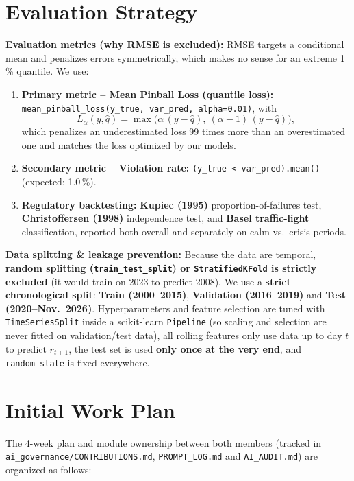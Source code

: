 \documentclass[10pt,a4paper]{article}
\newcommand{\code}[1]{\texttt{\small #1}}
\begin{document}
\section{Evaluation Strategy}
\textbf{Evaluation metrics (why RMSE is excluded):} RMSE targets a conditional mean and penalizes errors symmetrically, which makes no sense for an extreme 1\,\% quantile. We use:
\begin{enumerate}
  \item \textbf{Primary metric -- Mean Pinball Loss (quantile loss):} \code{mean\_pinball\_loss(y\_true, var\_pred, alpha=0.01)}, with
  \[
    L_\alpha(y,\hat q) = \max\big(\alpha\,(y-\hat q),\ (\alpha-1)\,(y-\hat q)\big),
  \]
  which penalizes an underestimated loss 99 times more than an overestimated one and matches the loss optimized by our models.
  \item \textbf{Secondary metric -- Violation rate:} \code{(y\_true < var\_pred).mean()} (expected: 1.0\,\%).
  \item \textbf{Regulatory backtesting:} \textbf{Kupiec (1995)} proportion-of-failures test, \textbf{Christoffersen (1998)} independence test, and \textbf{Basel traffic-light} classification, reported both overall and separately on calm vs.\ crisis periods.
\end{enumerate}

\textbf{Data splitting \& leakage prevention:} Because the data are temporal, \textbf{random splitting (\code{train\_test\_split}) or \code{StratifiedKFold} is strictly excluded} (it would train on 2023 to predict 2008). We use a \textbf{strict chronological split}: \textbf{Train (2000--2015)}, \textbf{Validation (2016--2019)} and \textbf{Test (2020--Nov.\ 2026)}. Hyperparameters and feature selection are tuned with \code{TimeSeriesSplit} inside a scikit-learn \code{Pipeline} (so scaling and selection are never fitted on validation/test data), all rolling features only use data up to day $t$ to predict $r_{t+1}$, the test set is used \textbf{only once at the very end}, and \code{random\_state} is fixed everywhere.

\section{Initial Work Plan}
The 4-week plan and module ownership between both members (tracked in \code{ai\_governance/CONTRIBUTIONS.md}, \code{PROMPT\_LOG.md} and \code{AI\_AUDIT.md}) are organized as follows:
\end{document}
